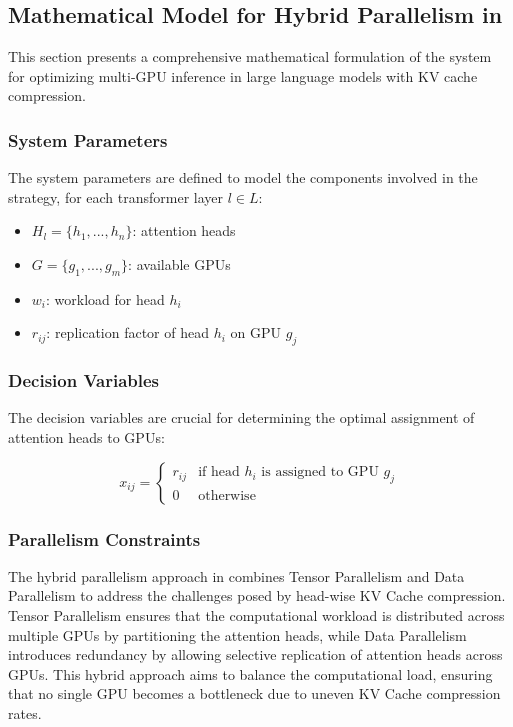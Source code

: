 \subsection{Mathematical Model for Hybrid Parallelism in \AlgName{}}
This section presents a comprehensive mathematical formulation of the \AlgName{} system for optimizing multi-GPU inference in large language models with KV cache compression.

\subsubsection{System Parameters}
The system parameters are defined to model the components involved in the \AlgName{} strategy, for each transformer layer $l \in L$:
\begin{itemize}
    \item $H_l = \{h_1, ..., h_n\}$: attention heads
    \item $G = \{g_1, ..., g_m\}$: available GPUs
    \item $w_i$: workload for head $h_i$
    \item $r_{ij}$: replication factor of head $h_i$ on GPU $g_j$
\end{itemize}

\subsubsection{Decision Variables}
The decision variables are crucial for determining the optimal assignment of attention heads to GPUs:

\begin{equation}
    x_{ij} = \begin{cases} 
        r_{ij} & \text{if head } h_i \text{ is assigned to GPU } g_j \\
        0 & \text{otherwise}
    \end{cases}
\end{equation}

\subsubsection{Parallelism Constraints}

The hybrid parallelism approach in \AlgName{} combines Tensor Parallelism and Data Parallelism to address the challenges posed by head-wise KV Cache compression. Tensor Parallelism ensures that the computational workload is distributed across multiple GPUs by partitioning the attention heads, while Data Parallelism introduces redundancy by allowing selective replication of attention heads across GPUs. This hybrid approach aims to balance the computational load, ensuring that no single GPU becomes a bottleneck due to uneven KV Cache compression rates.


